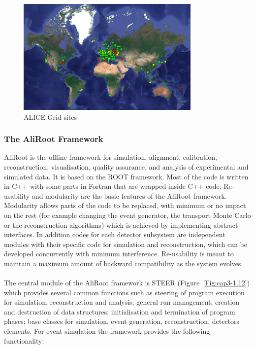 \begin{figure}[t]
\centering
\includegraphics[width=0.8\textwidth]{Images/Chapter3/grid_sites}
\caption[ALICE Grid sites]{ALICE Grid sites}
\label{Fig:cap3-1.11}
\end{figure}

\subsubsection*{The AliRoot Framework}
AliRoot is the offline framework for simulation, alignment, calibration, reconstruction, visualisation, quality assurance, and analysis of experimental and simulated data. It is based on the ROOT framework. Most of the code is written in C++ with some parts in Fortran that are wrapped inside C++ code. Re-usability and modularity are the basic features of the AliRoot framework. Modularity allows parts of the code to be replaced, with minimum or no impact on the rest (for example changing the event generator, the transport Monte Carlo or the reconstruction algorithms) which is achieved by implementing abstract interfaces. In addition codes for each detector subsystem are independent modules with their specific code for simulation and reconstruction, which can be developed concurrently with minimum interference. Re-usability is meant to maintain a maximum amount of backward compatibility as the system evolves.\\
\\
The central module of the AliRoot framework is STEER (\mbox{Figure \ref{Fig:cap3-1.12}}) which provides several common functions such as steering of program execution for simulation, reconstruction and analysis; general run management; creation and destruction of data structures; initialisation and termination of program phases; base classes for simulation, event generation, reconstruction, detectors elements. For event simulation the framework provides the following functionality:

